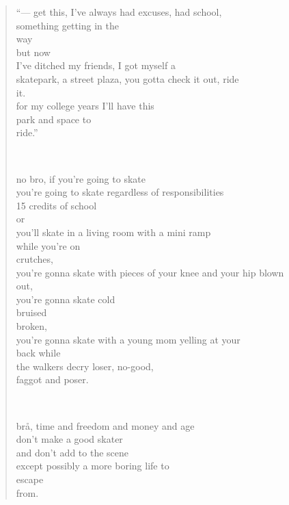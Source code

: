 \begin{verse}
``--- get this, I've always had excuses, had school, \\
something getting in the \\
way \\
but now \\
I've ditched my friends, I got myself a \\
skatepark, a street plaza, you gotta check it out, ride \\
it. \\
for my college years I'll have this \\
park and space to \\
ride.''

~

no bro, if you're going to skate \\
you're going to skate regardless of responsibilities \\
15 credits of school \\
or \\
you'll skate in a living room with a mini ramp \\
while you're on \\
crutches, \\
you're gonna skate with pieces of your knee and your hip blown \\
out, \\
you're gonna skate cold \\
bruised \\
broken, \\
you're gonna skate with a young mom yelling at your \\
back while \\
the walkers decry loser, no-good, \\
faggot and poser.

~

br\r{a}, time and freedom and money and age \\
don't make a good skater \\
and don't add to the scene \\
except possibly a more boring life to \\
escape \\
from. \\
\end{verse}
